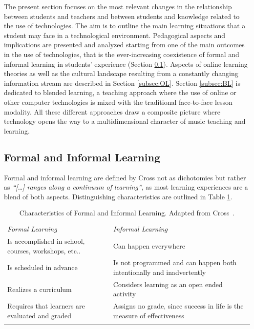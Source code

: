 \documentclass[10pt,journal,compsoc]{IEEEtran}
\begin{document}
The present section focuses on the most relevant changes in the relationship between students and teachers and between students and knowledge related to the use of technologies. The aim is to outline the main learning situations that a student may face in a technological environment. Pedagogical aspects and implications are presented and analyzed starting from one of the main outcomes in the use of technologies, that is the ever-increasing coexistence of formal and informal learning in students' experience (Section \ref{subsec:FIL}). Aspects of online learning theories as well as the cultural landscape resulting from a constantly changing information stream are described in Section \ref{subsec:OL}. Section \ref{subsec:BL} is dedicated to blended learning, a teaching approach where the use of online or other computer technologies is mixed with the traditional face-to-face lesson modality. 
All these different approaches draw a composite picture where technology opens the way to a multidimensional character of music teaching and learning. 

\subsection{Formal and Informal Learning} \label{subsec:FIL}
Formal and informal learning are defined by Cross \cite[p. 12]{cross2011informal} not as dichotomies but rather as \textit{``[\ldots] ranges along a continuum of learning''}, as most learning experiences are a blend of both aspects. Distinguishing characteristics are outlined in Table \ref{tab:FIL}. 

\begin{table}[tb]
	\caption{Characteristics of Formal and Informal Learning. Adapted from 
		Cross~\cite{cross2011informal}.}
	\label{tab:FIL}  
	\centering     
	\begin{tabular}{p{}p{}}
		\hline\noalign{\smallskip}
		\textit{Formal Learning} & \textit{Informal Learning}  \\
		\noalign{\smallskip}\noalign{\smallskip}
		Is accomplished in school, courses, workshops, etc.. & Can happen everywhere\\
		Is scheduled in advance & Is not programmed and can happen both intentionally and inadvertently\\
		Realizes a curriculum & Considers learning as an open ended activity\\
		Requires that learners are evaluated and graded & Assigns no grade, since success in life is the measure of effectiveness\\
		\noalign{\smallskip}\hline\noalign{\smallskip}
	\end{tabular}
\end{table}
\end{document}
